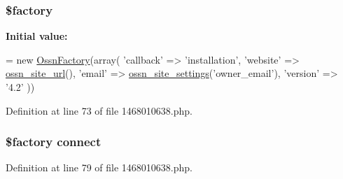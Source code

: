 \subsubsection[{\texorpdfstring{\$factory}{$factory}}]{\setlength{\rightskip}{0pt plus 5cm}\$factory}\hypertarget{1468010638_8php_a099b374dc664ee043fffcd6ea05e3e70}{}\label{1468010638_8php_a099b374dc664ee043fffcd6ea05e3e70}
{\bfseries Initial value\+:}
\begin{DoxyCode}
= \textcolor{keyword}{new} \hyperlink{class_ossn_factory}{OssnFactory}(array(
        \textcolor{stringliteral}{'callback'} => \textcolor{stringliteral}{'installation'},
        \textcolor{stringliteral}{'website'} => \hyperlink{ossn_8lib_8system_8php_a2f12f9244f99eccd1225afb76ef2ab65}{ossn\_site\_url}(),
        \textcolor{stringliteral}{'email'} => \hyperlink{ossn_8lib_8system_8php_a610e2045b8a86c09f777b4d82e24e34c}{ossn\_site\_settings}(\textcolor{stringliteral}{'owner\_email'}),
        \textcolor{stringliteral}{'version'} => \textcolor{stringliteral}{'4.2'}
))
\end{DoxyCode}


Definition at line 73 of file 1468010638.\+php.

\subsubsection[{\texorpdfstring{connect}{connect}}]{\setlength{\rightskip}{0pt plus 5cm}\$factory connect}\hypertarget{1468010638_8php_a3fdbedd7713e458f25fcf7dc1f562a3d}{}\label{1468010638_8php_a3fdbedd7713e458f25fcf7dc1f562a3d}


Definition at line 79 of file 1468010638.\+php.

